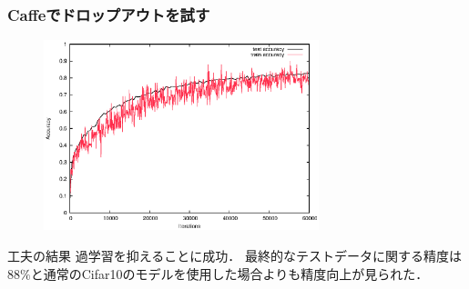 \documentclass[dvipdfmx,11pt,notheorems]{beamer}
\theoremstyle{definition}
\begin{document}
\begin{frame}[fragile]\frametitle{Caffeでドロップアウトを試す}
\begin{figure}[tb]
  \begin{center}
    \includegraphics[clip,width=8cm]{./fig/eps/dropout.eps}
  \end{center}
\end{figure}
\begin{block}{工夫の結果}
過学習を抑えることに成功．
最終的なテストデータに関する精度は$88\%$と通常のCifar10のモデルを使用した場合よりも精度向上が見られた．
\end{block}
\end{frame}
\end{document}
